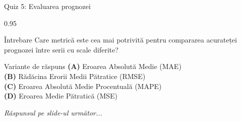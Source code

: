 \documentclass[9pt, aspectratio=169, t]{beamer}
\begin{document}
\begin{frame}{Quiz 5: Evaluarea prognozei}
    \begin{cminipage}{0.95\textwidth}
    \begin{alertblock}{Întrebare}
        Care metrică este cea mai potrivită pentru compararea acurateței prognozei între serii cu scale diferite?
    \end{alertblock}

    \vspace{0.4cm}

    \begin{block}{Variante de răspuns}
        \textcolor{MainBlue}{\textbf{(A)}} Eroarea Absolută Medie (MAE)\\[3pt]
        \textcolor{MainBlue}{\textbf{(B)}} Rădăcina Erorii Medii Pătratice (RMSE)\\[3pt]
        \textcolor{MainBlue}{\textbf{(C)}} Eroarea Absolută Medie Procentuală (MAPE)\\[3pt]
        \textcolor{MainBlue}{\textbf{(D)}} Eroarea Medie Pătratică (MSE)
    \end{block}

    \vspace{0.5cm}

    \begin{center}
        \textit{Răspunsul pe slide-ul următor...}
    \end{center}
    \end{cminipage}
\end{frame}
\end{document}
